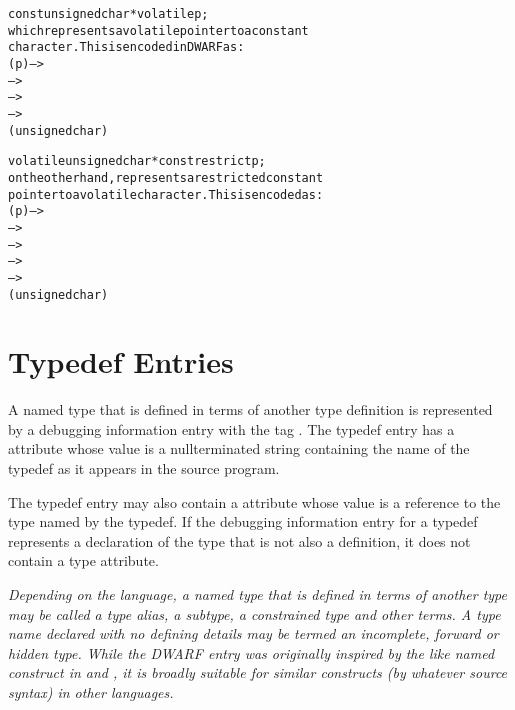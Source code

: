 \begin{alltt}
const unsigned char * volatile p;
    which represents a volatile pointer to a constant
    character. This is encoded in DWARF as:
        (p) -->
             -->
                 -->
                     -->
                        (unsigned char)

volatile unsigned char * const restrict p;
    on the other hand, represents a restricted constant
    pointer to a volatile character. This is encoded as:
        (p) -->
             -->
                 -->
                     -->
                         -->
                            (unsigned char)

\end{alltt}

\section{Typedef Entries}
\label{chap:typedefentries}
A named type that is defined in terms of another type
definition is represented by a debugging information entry with
the tag . 
The typedef entry has a  attribute 
whose value is a null\dash terminated string containing
the name of the typedef as it appears in the source program.

The typedef entry may also contain 
a 
 attribute whose
value is a reference to the type named by the typedef. If
the debugging information entry for a typedef represents
a declaration of the type that is not also a definition,
it does not contain a type attribute.

\textit{Depending on the language, a named type that is defined in
terms of another type may be called a type alias, a subtype,
a constrained type and other terms. A type name declared with
no defining details may be termed an 
incomplete, forward or hidden type. 
While the DWARF  entry was
originally inspired by the like named construct in 
 and ,
it is broadly suitable for similar constructs (by whatever
source syntax) in other languages.}

